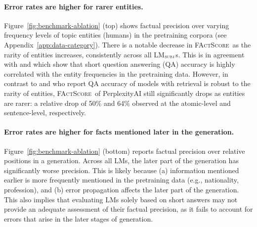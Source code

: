 \documentclass[11pt]{article}
\newcommand{\ours}{\textsc{FActScore}}
\newcommand{\subjectLM}{LM$_\textsc{subj}$}
\newcommand{\pw}[1]{%
}
\begin{document}
\paragraph{Error rates are higher for rarer entities.} 
Figure~\ref{fig:benchmark-ablation} (top) shows factual precision over varying frequency levels of topic entities (humans) in the pretraining corpora (see Appendix~\ref{app:data-category}).
There is a notable decrease in \ours\ as the rarity of entities increases, consistently across all \subjectLM{}s.
This is in agreement with \citet{kandpal2022large} and \citet{mallen2022not} which show that short question answering (QA) accuracy is highly correlated with the entity frequencies in the pretraining data. %
However, in contrast to \citet{kandpal2022large} and \citet{mallen2022not} who report QA accuracy of models with retrieval 
is robust to the rarity of entities,
\ours\ of PerplexityAI still significantly drops as entities are rarer: a relative drop of 50\% and 64\% observed at the atomic-level and sentence-level, respectively.

\vspace{-.3em}
\paragraph{Error rates are higher for facts mentioned later in the generation.} 
Figure~\ref{fig:benchmark-ablation} (bottom) reports factual precision over relative positions in a generation. %
Across all LMs, the later part of the generation has significantly worse precision. This is likely because (a) information mentioned earlier is more frequently mentioned in the pretraining data (e.g., nationality, profession), and (b) error propagation affects the later part of the generation.
This also implies that evaluating LMs solely based on short answers may not provide an adequate assessment of their factual precision, as it fails to account for errors that arise in the later stages of generation.
\end{document}

